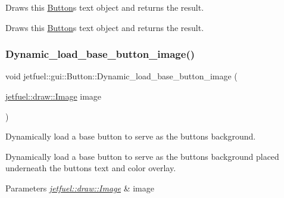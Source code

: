 Draws this \hyperlink{classjetfuel_1_1gui_1_1Button}{Button}\textquotesingle{}s text object and returns the result. 

Draws this \hyperlink{classjetfuel_1_1gui_1_1Button}{Button}\textquotesingle{}s text object and returns the result. \mbox{\label{classjetfuel_1_1gui_1_1Button_a452110801fca1b3274d574ebc671e8db}} 
\subsubsection{\texorpdfstring{Dynamic\+\_\+load\+\_\+base\+\_\+button\+\_\+image()}{Dynamic\_load\_base\_button\_image()}}
{\footnotesize\ttfamily void jetfuel\+::gui\+::\+Button\+::\+Dynamic\+\_\+load\+\_\+base\+\_\+button\+\_\+image (\begin{DoxyParamCaption}\item[{\hyperlink{classjetfuel_1_1draw_1_1Image}{jetfuel\+::draw\+::\+Image}}]{image }\end{DoxyParamCaption})\hspace{0.3cm}{\ttfamily [inline]}}



Dynamically load a base button to serve as the button\textquotesingle{}s background. 

Dynamically load a base button to serve as the button\textquotesingle{}s background placed underneath the button\textquotesingle{}s text and color overlay.


\begin{DoxyParams}{Parameters}
{\em \hyperlink{classjetfuel_1_1draw_1_1Image}{jetfuel\+::draw\+::\+Image}} & image \\
\hline
\end{DoxyParams}
\mbox{\label{classjetfuel_1_1gui_1_1Button_a4269075522becce58d220d3aa4bbd6ec}} 
